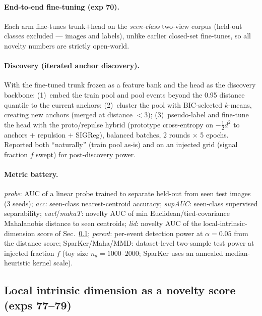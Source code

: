 \documentclass[11pt]{article}
\begin{document}
\paragraph{End-to-end fine-tuning (exp 70).}
Each arm fine-tunes trunk$+$head on the \emph{seen-class} two-view corpus
(held-out classes excluded --- images and labels), unlike earlier
closed-set fine-tunes, so all novelty numbers are strictly open-world.

\paragraph{Discovery (iterated anchor discovery).}
With the fine-tuned trunk frozen as a feature bank and the head as the
discovery backbone: (1)~embed the train pool and pool events beyond the
0.95 distance quantile to the current anchors; (2)~cluster the pool with
BIC-selected $k$-means, creating new anchors (merged at distance $<3$);
(3)~pseudo-label and fine-tune the head with the proto/repulse hybrid
(prototype cross-entropy on $-\tfrac12 d^2$ to anchors $+$ repulsion $+$
SIGReg), balanced batches, 2 rounds $\times$ 5 epochs.  Reported both
``naturally'' (train pool as-is) and on an injected grid (signal fraction
$f$ swept) for post-discovery power.

\paragraph{Metric battery.}
\emph{probe}: AUC of a linear probe trained to separate held-out from
seen test images (3 seeds); \emph{acc}: seen-class nearest-centroid
accuracy; \emph{supAUC}: seen-class supervised separability;
\emph{eucl}/\emph{mahaT}: novelty AUC of min Euclidean/tied-covariance
Mahalanobis distance to seen centroids; \emph{lid}: novelty AUC of the
local-intrinsic-dimension score of Sec.~\ref{sec:lid}; \emph{perevt}:
per-event detection power at $\alpha{=}0.05$ from the distance score;
SparKer/Maha/MMD: dataset-level two-sample test power at injected
fraction $f$ (toy size $n_d{=}1000$--$2000$; SparKer uses an annealed
median-heuristic kernel scale).

\subsection{Local intrinsic dimension as a novelty score (exps 77--79)}
\label{sec:lid}
\end{document}
